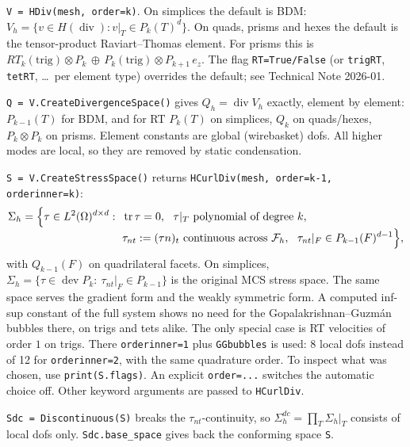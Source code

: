 \documentclass[10pt,a4paper]{article}
\newcommand{\code}[1]{\texttt{#1}}
\newcommand{\dev}{\operatorname{dev}}
\newcommand{\Fh}{\mathcal{F}_h}
\begin{document}
\begin{description}\setlength\itemsep{3pt}
\item[Velocity] \code{V = HDiv(mesh, order=k)}.
  On simplices the default is BDM: $V_h = \{v\in H(\operatorname{div}): v|_T \in P_k(T)^d\}$. On quads, prisms and hexes the default is the tensor-product Raviart--Thomas element. For prisms this is $RT_k(\text{trig})\otimes P_k \,\oplus\, P_k(\text{trig})\otimes P_{k+1}\,e_z$. The flag \code{RT=True/False} (or \code{trigRT}, \code{tetRT}, \dots\ per element type) overrides the default; see Technical Note 2026-01.

\item[Pressure] \code{Q = V.CreateDivergenceSpace()} gives $Q_h = \operatorname{div} V_h$ exactly, element by element:
  $P_{k-1}(T)$ for BDM, and for RT $P_k(T)$ on simplices, $Q_k$ on quads/hexes, $P_k\otimes P_k$ on prisms.
  Element constants are global (wirebasket) dofs. All higher modes are local, so they are removed by static condensation.

\item[Stress] \code{S = V.CreateStressSpace()} returns \code{HCurlDiv(mesh, order=k-1, orderinner=k)}:
  \[
    \Sigma_h=\Bigl\{\tau\in L^2(\Omega)^{d\times d}:\ \begin{aligned}[t]&\operatorname{tr}\tau=0,\ \ \tau|_T \text{ polynomial of degree }k,\\
      &\tau_{nt}:=(\tau n)_t \text{ continuous across } \Fh,\ \ \tau_{nt}|_F\in P_{k-1}(F)^{d-1}\Bigr\},\end{aligned}
  \]
  with $Q_{k-1}(F)$ on quadrilateral facets. On simplices, $\Sigma_h = \{\tau\in\dev P_k:\ \tau_{nt}|_F\in P_{k-1}\}$ is the original MCS stress space.
  The same space serves the gradient form and the weakly symmetric form. A computed inf-sup constant of the full system shows no need for the Gopalakrishnan--Guzm\'an bubbles \cite{gg} there, on trigs and tets alike.
  The only special case is RT velocities of order $1$ on trigs. There \code{orderinner=1} plus \code{GGbubbles} is used: 8 local dofs instead of 12 for \code{orderinner=2}, with the same quadrature order.
  To inspect what was chosen, use \code{print(S.flags)}.
  An explicit \code{order=...} switches the automatic choice off. Other keyword arguments are passed to \code{HCurlDiv}.

\item[Hybridized stress] \code{Sdc = Discontinuous(S)} breaks the $\tau_{nt}$-continuity, so $\Sigma_h^{dc} = \prod_T \Sigma_h|_T$ consists of local dofs only.
  \code{Sdc.base\_space} gives back the conforming space \code{S}.


\end{description}
\end{document}
